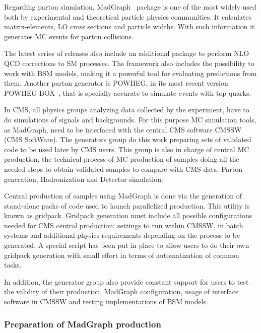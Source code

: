 Regarding parton simulation, MadGraph~\cite{Alwall:2014hca, Alwall:2011uj} package is one of the most widely used both by experimental and theoretical particle physics communities. It calculates matrix-elements, LO cross sections and particle widths. With such information it generates MC events for parton collisions. 

The latest series of releases also include an additional package to perform NLO QCD corrections to SM processes. The framework also includes the possibility to work with BSM models, making it a powerful tool for evaluating predictions from them. Another parton generator is POWHEG, in its most recent version POWHEG BOX~\cite{Nason:2004rx, Frixione:2007vw, Alioli:2010xd}, that is specially accurate to simulate events with top quarks. %

In CMS, all physics groups analyzing data collected by the experiment, have to do simulations of signals and backgrounds. For this purpose MC simulation tools, as MadGraph, need to be interfaced with the central CMS software CMSSW (CMS SoftWare). The generators group do this work preparing sets of validated code to be used later by CMS users. This group is also in charge of central MC production, the technical process of MC production of samples doing all the needed steps to obtain validated samples to compare with CMS data: Parton generation, Hadronization and Detector simulation. 

Central production of samples using MadGraph is done via the generation of stand-alone packs of code used to launch parallelized production. This utility is known as gridpack. Gridpack generation must include all possible configurations needed for CMS central production: settings to run within CMSSW, in batch systems and additional physics requirements depending on the process to be generated. A special script has been put in place to allow users to do their own gridpack generation with small effort in terms of automatization of common tasks.

In addition, the generator group also provide constant support for users to test the validity of their production, MadGraph configuration, usage of interface software in CMSSW and testing implementations of BSM models.

\subsubsection{Preparation of MadGraph production}

